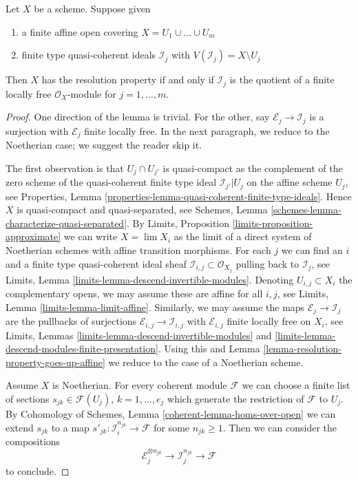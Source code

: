 \begin{lemma}
\label{lemma-resolution-property-finite-number}
Let $X$ be a scheme. Suppose given
\begin{enumerate}
\item a finite affine open covering $X = U_1 \cup \ldots \cup U_m$
\item finite type quasi-coherent ideals $\mathcal{I}_j$
with $V(\mathcal{I}_j) = X \setminus U_j$
\end{enumerate}
Then $X$ has the resolution property if and only if $\mathcal{I}_j$
is the quotient of a finite locally free $\mathcal{O}_X$-module
for $j = 1, \ldots, m$.
\end{lemma}

\begin{proof}
One direction of the lemma is trivial. For the other, 
say $\mathcal{E}_j \to \mathcal{I}_j$ is a surjection with
$\mathcal{E}_j$ finite locally free. In the next paragraph, we
reduce to the Noetherian case; we suggest the reader skip it.

\medskip\noindent
The first observation is that $U_j \cap U_{j'}$ is quasi-compact
as the complement of the zero scheme of the quasi-coherent finite type ideal
$\mathcal{I}_{j'}|{U_j}$ on the affine scheme $U_j$, see
Properties, Lemma \ref{properties-lemma-quasi-coherent-finite-type-ideals}.
Hence $X$ is quasi-compact and quasi-separated, see
Schemes, Lemma \ref{schemes-lemma-characterize-quasi-separated}.
By Limits, Proposition \ref{limits-proposition-approximate}
we can write $X = \lim X_i$ as the limit of a direct system of
Noetherian schemes with affine transition morphisms. For each $j$
we can find an $i$ and a finite type quasi-coherent ideal sheaf
$\mathcal{I}_{i, j} \subset \mathcal{O}_{X_j}$
pulling back to $\mathcal{I}_j$, see
Limits, Lemma \ref{limits-lemma-descend-invertible-modules}.
Denoting $U_{i, j} \subset X_i$ the complementary opens, we
may assume these are affine for all $i, j$, see
Limits, Lemma \ref{limits-lemma-limit-affine}.
Similarly, we may assume the maps $\mathcal{E}_j \to \mathcal{I}_j$
are the pullbacks of surjections
$\mathcal{E}_{i, j} \to \mathcal{I}_{i, j}$
with $\mathcal{E}_{i, j}$ finite locally free on $X_i$, see
Limits, Lemmas \ref{limits-lemma-descend-invertible-modules}
and \ref{limits-lemma-descend-modules-finite-presentation}.
Using this and Lemma \ref{lemma-resolution-property-goes-up-affine}
we reduce to the case of a Noetherian scheme.

\medskip\noindent
Assume $X$ is Noetherian. For every coherent module $\mathcal{F}$
we can choose a finite list of sections $s_{jk} \in \mathcal{F}(U_j)$,
$k = 1, \ldots, e_j$ which generate the restriction of $\mathcal{F}$ to $U_j$.
By Cohomology of Schemes, Lemma \ref{coherent-lemma-homs-over-open}
we can extend $s_{jk}$ to a map
$s'_{jk} : \mathcal{I}_i^{n_{jk}} \to \mathcal{F}$ for some $n_{jk} \geq 1$.
Then we can consider the compositions
$$
\mathcal{E}_j^{\otimes n_{jk}} \to \mathcal{I}_j^{n_{jk}} \to \mathcal{F}
$$
to conclude.
\end{proof}

